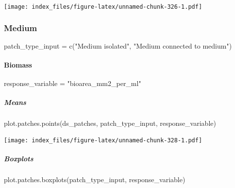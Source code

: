 \documentclass[
]{article}
\newenvironment{Shaded}{\begin{snugshade}}{\end{snugshade}}
\newcommand{\FunctionTok}[1]{\textcolor[rgb]{0.00,0.00,0.00}{#1}}
\newcommand{\NormalTok}[1]{#1}
\newcommand{\OtherTok}[1]{\textcolor[rgb]{0.56,0.35,0.01}{#1}}
\newcommand{\StringTok}[1]{\textcolor[rgb]{0.31,0.60,0.02}{#1}}
\begin{document}
\texttt{[image: index\_files/figure-latex/unnamed-chunk-326-1.pdf]}

\hypertarget{medium}{%
\subsubsection{Medium}\label{medium}}

\begin{Shaded}
\begin{Highlighting}[]
\NormalTok{patch\_type\_input }\OtherTok{=} \FunctionTok{c}\NormalTok{(}\StringTok{"Medium isolated"}\NormalTok{,}
                     \StringTok{"Medium connected to medium"}\NormalTok{)}
\end{Highlighting}
\end{Shaded}

\hypertarget{biomass-5}{%
\paragraph{Biomass}\label{biomass-5}}

\begin{Shaded}
\begin{Highlighting}[]
\NormalTok{response\_variable }\OtherTok{=} \StringTok{"bioarea\_mm2\_per\_ml"}
\end{Highlighting}
\end{Shaded}

\hypertarget{means-26}{%
\subparagraph{Means}\label{means-26}}

\begin{Shaded}
\begin{Highlighting}[]
\FunctionTok{plot.patches.points}\NormalTok{(ds\_patches, }
\NormalTok{                    patch\_type\_input,}
\NormalTok{                    response\_variable)}
\end{Highlighting}
\end{Shaded}

\texttt{[image: index\_files/figure-latex/unnamed-chunk-328-1.pdf]}

\hypertarget{boxplots-24}{%
\subparagraph{Boxplots}\label{boxplots-24}}

\begin{Shaded}
\begin{Highlighting}[]
\FunctionTok{plot.patches.boxplots}\NormalTok{(patch\_type\_input,}
\NormalTok{                       response\_variable)}
\end{Highlighting}
\end{Shaded}
\end{document}
